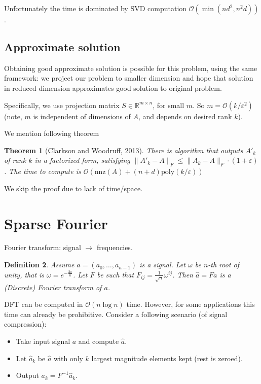\documentclass[11pt]{article}
\newtheorem{theorem}{Theorem}
\newtheorem{definition}[theorem]{Definition}
\newcommand{\bigo}{\mathcal{O}}
\begin{document}
Unfortunately the time is dominated by SVD computation $\bigo(\min(nd^2,n^2d))$.

\subsection{Approximate solution}
Obtaining good approximate solution is possible for this problem, using the same framework: we project our problem to smaller dimension and hope that solution in reduced dimension approximates good solution to original problem.

Specifically, we use projection matrix $S \in \mathbb{R}^{m \times n}$, for small $m$. So $m = \bigo(k/\varepsilon^2)$ (note, $m$ is independent of dimensions of $A$, and depends on desired rank $k$). 

We mention following theorem

\begin{theorem}[Clarkson and Woodruff, 2013]
There is algorithm that outputs $A'_k$ of rank $k$ in a factorized form, satisfying $\|A'_k - A\|_F \le \|A_k - A\|_F \cdot (1+\varepsilon)$. The time to compute is $\bigo(\textrm{nnz}(A) + (n+d) \textrm{poly}(k/\varepsilon))$
\end{theorem}
We skip the proof due to lack of time/space.

\section{Sparse Fourier}
Fourier transform: signal $\to$ frequencies. 
\begin{definition}
Assume $a = (a_0,\ldots,a_{n-1})$ is a signal. Let $\omega$ be $n$-th root of unity, that is $\omega = e^{-\frac{2 \pi}{n}}$. Let $F$ be such that $F_{ij} = \frac{1}{\sqrt{n}}\omega^{ij}$. Then $\hat{a} = F a$ is a (Discrete) Fourier transform of $a$.
\end{definition}

DFT can be computed in $\bigo(n \log n)$ time. However, for some applications this time can already be prohibitive. Consider a following scenario (of signal compression):
\begin{itemize}
\item Take input signal $a$ and compute $\hat{a}$.
\item Let $\hat{a}_k$ be $\hat{a}$ with only $k$ largest magnitude elements kept (rest is zeroed).
\item Output $a_k = F^{-1} \hat{a}_k$.
\end{itemize}
\end{document}
